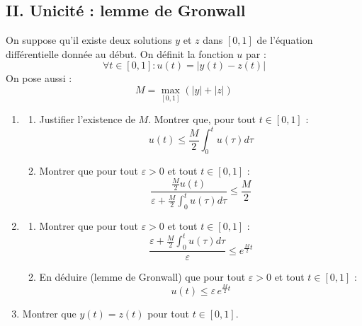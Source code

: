 \subsection*{II. Unicité : lemme de Gronwall}
On suppose qu'il existe deux solutions $y$ et $z$ dans $[0,1]$ de l'équation différentielle donnée au début. On définit la fonction $u$ par :
\begin{displaymath}
 \forall t\in [0,1] : u(t) = |y(t) -z(t)|
\end{displaymath}
On pose aussi :
\begin{displaymath}
 M = \max_{[0,1]}\left( |y| + |z|\right)
\end{displaymath}
\begin{enumerate}
 \item \begin{enumerate}
 \item Justifier l'existence de $M$. Montrer que, pour tout $t\in [0,1]$ :
\begin{displaymath}
 u(t) \leq \frac{M}{2}\int_0^t u(\tau)d\tau
\end{displaymath}
\item Montrer que pour tout $\varepsilon>0$ et tout $t\in[0,1]$ :
\begin{displaymath}
\frac{\frac{M}{2}u(t)}{\varepsilon + \frac{M}{2}\int_0^t u(\tau)d\tau}
\leq \frac{M}{2}
\end{displaymath}
\end{enumerate}
\item \begin{enumerate}
 \item Montrer que pour tout $\varepsilon>0$ et tout $t\in[0,1]$ :
\begin{displaymath}
\frac{\varepsilon + \frac{M}{2}\int_0^t u(\tau)d\tau}{\varepsilon}
\leq e^{\frac{M}{2}t}
\end{displaymath}
\item En déduire (lemme de Gronwall) que pour tout $\varepsilon>0$ et tout $t\in[0,1]$ :
\begin{displaymath}
 u(t) \leq \varepsilon \,e^{\frac{M}{2}t}
\end{displaymath}
\end{enumerate}

\item Montrer que $y(t)=z(t)$ pour tout $t\in[0,1]$.
\end{enumerate}



